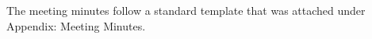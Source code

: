 	The meeting minutes follow a standard template that was attached under Appendix: Meeting Minutes. \par

